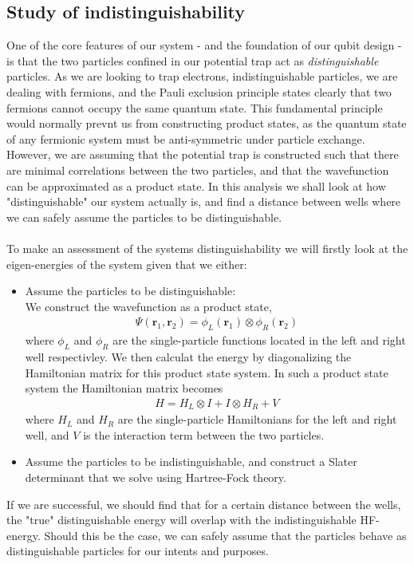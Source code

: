 \documentclass{subfiles}
\begin{document}
\subsection{Study of indistinguishability}
One of the core features of our system - and the foundation of our qubit design -is that the two particles confined in our potential trap act as \emph{distinguishable} particles. As we are looking to trap electrons, indistinguishable particles, we are dealing with fermions, and the Pauli exclusion principle states clearly that two fermions cannot occupy the same quantum state. This fundamental principle would normally prevnt us from constructing product states, as the quantum state of any fermionic system must be anti-symmetric under particle exchange.
\\ However, we are assuming that the potential trap is constructed such that there are minimal correlations between the two particles, and that the wavefunction can be approximated as a product state. In this analysis we shall look at how "distinguishable" our system actually is, and find a distance between wells where we can safely assume the particles to be distinguishable. \\ \\
To make an assessment of the systems distinguishability we will firstly look at the eigen-energies of the system given that we either:
\begin{itemize}
    \item Assume the particles to be distinguishable: \\ We construct the wavefunction as a product state,
    \begin{align*}
        \Psi(\mathbf{r}_1, \mathbf{r}_2) = \phi_L(\mathbf{r}_1)\otimes\phi_R(\mathbf{r}_2)
    \end{align*} 
    where $\phi_L$ and $\phi_R$ are the single-particle functions located in the left and right well respectivley. We then calculat the energy by diagonalizing the Hamiltonian matrix for this product state system. In such a product state system the Hamiltonian matrix becomes
    \begin{align*}
        H = H_L \otimes I + I \otimes H_R + V
    \end{align*}
    where $H_L$ and $H_R$ are the single-particle Hamiltonians for the left and right well, and $V$ is the interaction term between the two particles.
    \item Assume the particles to be indistinguishable, and construct a Slater determinant that we solve using Hartree-Fock theory.
\end{itemize}


If we are successful, we should find that for a certain distance between the wells, the "true" distinguishable energy will overlap with the indistinguishable HF-energy. Should this be the case, we can safely assume that the particles behave as distinguishable particles for our intents and purposes. 
\end{document}
